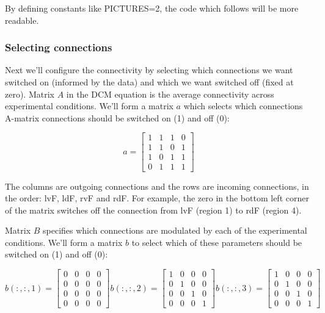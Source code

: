 \documentclass{article}
\begin{document}
By defining constants like PICTURES=2, the code which follows will be more readable. 

\subsubsection{Selecting connections}

Next we'll configure the connectivity by selecting which connections we want switched on (informed by the data) and which we want switched off (fixed at zero). Matrix \(A\) in the DCM equation is the average connectivity across experimental conditions. We'll form a matrix  \(a\) which selects which connections A-matrix connections should be switched on (1) and off (0):

\[
 a=\begin{bmatrix}
  1 & 1 & 1 & 0 \\
  1 & 1 & 0 & 1 \\
  1 & 0 & 1 & 1 \\
  0 & 1 & 1 & 1
 \end{bmatrix}
\]

The columns are outgoing connections and the rows are incoming connections, in the order: lvF, ldF, rvF and rdF. For example, the zero in the bottom left corner of the matrix switches off the connection from lvF (region 1) to rdF (region 4). 

Matrix \(B\) specifies which connections are modulated by each of the experimental conditions. We'll form a matrix \(b\) to select which of these parameters should be switched on (1) and off (0):

\[
 b(:,:,1)=\begin{bmatrix}
  0 & 0 & 0 & 0 \\
  0 & 0 & 0 & 0 \\
  0 & 0 & 0 & 0 \\
  0 & 0 & 0 & 0
 \end{bmatrix} 
b(:,:,2)=\begin{bmatrix}
  1 & 0 & 0 & 0 \\
  0 & 1 & 0 & 0 \\
  0 & 0 & 1 & 0 \\
  0 & 0 & 0 & 1
 \end{bmatrix} 
b(:,:,3)=\begin{bmatrix}
  1 & 0 & 0 & 0 \\
  0 & 1 & 0 & 0 \\
  0 & 0 & 1 & 0 \\
  0 & 0 & 0 & 1
 \end{bmatrix}  
\]
\end{document}
